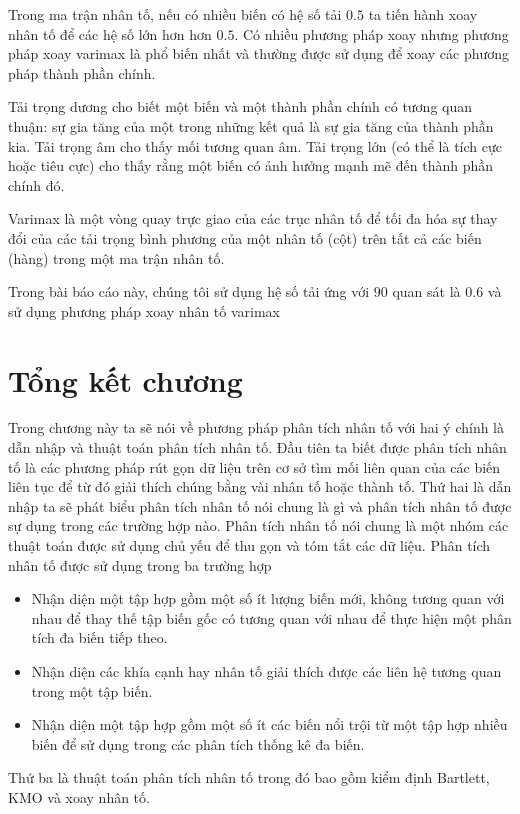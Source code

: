 \documentclass[../thesis.tex]{subfiles}
\begin{document}
Trong ma trận nhân tố, nếu có nhiều biến có hệ số tải $ 0.5 $ ta tiến hành xoay nhân tố để các hệ số lớn hơn hơn $ 0.5 $. Có nhiều phương pháp xoay nhưng phương pháp xoay varimax là phổ biến nhất và thường được sử dụng để xoay các phương pháp thành phần chính.

Tải trọng dương cho biết một biến và một thành phần chính có tương quan thuận: sự gia tăng của một trong những kết quả là sự gia tăng của thành phần kia. Tải trọng âm cho thấy mối tương quan âm. Tải trọng lớn (có thể là tích cực hoặc tiêu cực) cho thấy rằng một biến có ảnh hưởng mạnh mẽ đến thành phần chính đó.

Varimax là một vòng quay trực giao của các trục nhân tố để tối đa hóa sự thay đổi của các tải trọng bình phương của một nhân tố (cột) trên tất cả các biến (hàng) trong một ma trận nhân tố.

Trong bài báo cáo này, chúng tôi sử dụng hệ số tải ứng với $ 90 $ quan sát là $ 0.6 $ và sử dụng phương pháp xoay nhân tố varimax 

\section*{Tổng kết chương}

Trong chương này ta sẽ nói về phương pháp phân tích nhân tố với hai ý chính là dẫn nhập và thuật toán phân tích nhân tố. 
Đầu tiên ta biết được phân tích nhân tố là các phương pháp rút gọn dữ liệu trên cơ sở tìm mối liên quan của các biến liên tục để từ đó giải thích chúng bằng vài nhân tố hoặc thành tố.
Thứ hai là dẫn nhập ta sẽ phát biểu phân tích nhân tố nói chung là gì và phân tích nhân tố được sự dụng trong các trường hợp nào.
Phân tích nhân tố nói chung là một nhóm các thuật toán được sử dụng chủ yếu để thu gọn và tóm tắt các dữ liệu. Phân tích nhân tố được sử dụng trong ba trường hợp

\begin{itemize}
	\item Nhận diện một tập hợp gồm một số ít lượng biến mới, không tương quan với nhau để thay thế tập biến gốc có tương quan với nhau để thực hiện một phân tích đa biến tiếp theo.
	\item Nhận diện các khía cạnh hay nhân tố giải thích được các liên hệ tương quan trong một tập biến.
	\item Nhận diện một tập hợp gồm một số ít các biến nổi trội từ một tập hợp nhiều biến để sử dụng trong các phân tích thống kê đa biến.
\end{itemize}

Thứ ba là thuật toán phân tích nhân tố trong đó bao gồm kiểm định Bartlett, KMO và xoay nhân tố.
\end{document}
